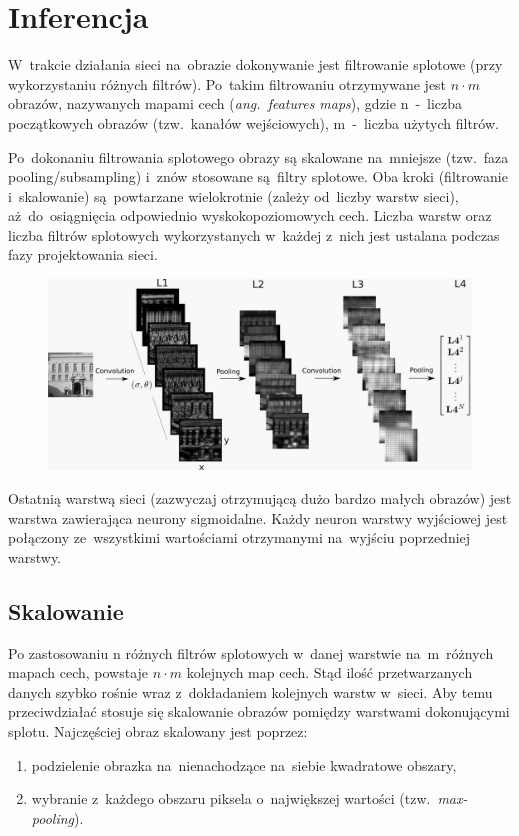 \section{Inferencja} \label{sec:inferencja}
W~trakcie działania sieci na~obrazie dokonywanie jest filtrowanie splotowe (przy wykorzystaniu różnych
filtrów). Po~takim filtrowaniu otrzymywane jest $n\cdot m$ obrazów, nazywanych mapami cech
(\textit{ang.~features maps}), gdzie n~-~liczba początkowych obrazów (tzw.~kanałów wejściowych), m~-~liczba
użytych filtrów.

Po~dokonaniu filtrowania splotowego obrazy są skalowane na~mniejsze (tzw.~faza pooling/subsampling) i~znów
stosowane są~filtry splotowe. Oba kroki (filtrowanie i~skalowanie) są~powtarzane wielokrotnie
(zależy od~liczby warstw sieci), aż~do~osiągnięcia odpowiednio wyskokopoziomowych cech. Liczba warstw oraz
liczba filtrów splotowych wykorzystanych w~każdej z~nich jest ustalana podczas fazy projektowania sieci.

\begin{figure}[H]
	\centering
	\includegraphics[width=\linewidth]{img/convnet.png}
\end{figure}

Ostatnią warstwą sieci (zazwyczaj otrzymującą dużo bardzo małych obrazów) jest warstwa zawierająca neurony
sigmoidalne. Każdy neuron warstwy wyjściowej jest połączony ze~wszystkimi wartościami otrzymanymi na~wyjściu
poprzedniej warstwy.

\subsection{Skalowanie}
Po zastosowaniu n różnych filtrów splotowych w~danej warstwie na~m~różnych mapach cech, powstaje $n\cdot m$
kolejnych map cech. Stąd ilość przetwarzanych danych szybko rośnie wraz z~dokładaniem kolejnych warstw
w~sieci. Aby temu przeciwdziałać stosuje się skalowanie obrazów pomiędzy warstwami dokonującymi splotu.
Najczęściej obraz skalowany jest poprzez:
\begin{enumerate}
  \item podzielenie obrazka na~nienachodzące na~siebie kwadratowe obszary,
  \item wybranie z~każdego obszaru piksela o~największej wartości (tzw.~\textit{max-pooling}). 
\end{enumerate}

